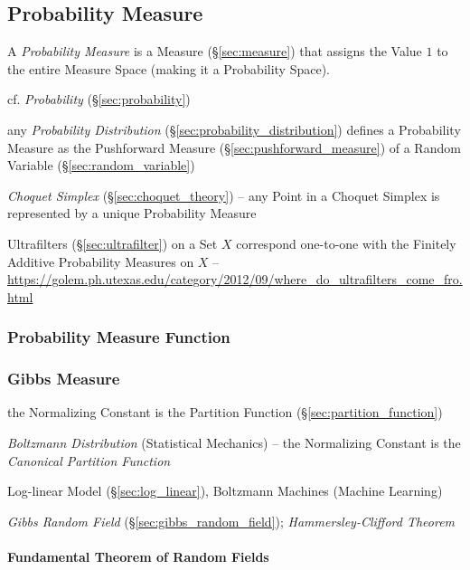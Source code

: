 \subsection{Probability Measure}\label{sec:probability_measure}

A \emph{Probability Measure} is a Measure (\S\ref{sec:measure}) that assigns the
Value $1$ to the entire Measure Space (making it a Probability Space).

cf. \emph{Probability} (\S\ref{sec:probability})

\fist any \emph{Probability Distribution} (\S\ref{sec:probability_distribution})
defines a Probability Measure as the Pushforward Measure
(\S\ref{sec:pushforward_measure}) of a Random Variable
(\S\ref{sec:random_variable})

\emph{Choquet Simplex} (\S\ref{sec:choquet_theory}) -- any Point in a Choquet
Simplex is represented by a unique Probability Measure

Ultrafilters (\S\ref{sec:ultrafilter}) on a Set $X$ correspond one-to-one with
the Finitely Additive Probability Measures on $X$
--\url{https://golem.ph.utexas.edu/category/2012/09/where_do_ultrafilters_come_fro.html}


\subsubsection{Probability Measure Function}
\label{sec:probability_measure_function}

\subsubsection{Gibbs Measure}\label{sec:gibbs_measure}

the Normalizing Constant is the Partition Function
(\S\ref{sec:partition_function})

\emph{Boltzmann Distribution} (Statistical Mechanics) -- the Normalizing
Constant is the \emph{Canonical Partition Function}

Log-linear Model (\S\ref{sec:log_linear}), Boltzmann Machines (Machine Learning)

\emph{Gibbs Random Field} (\S\ref{sec:gibbs_random_field});
\emph{Hammersley-Clifford Theorem}



\paragraph{Fundamental Theorem of Random Fields}
\label{sec:random_fields_theorem}\hfill

